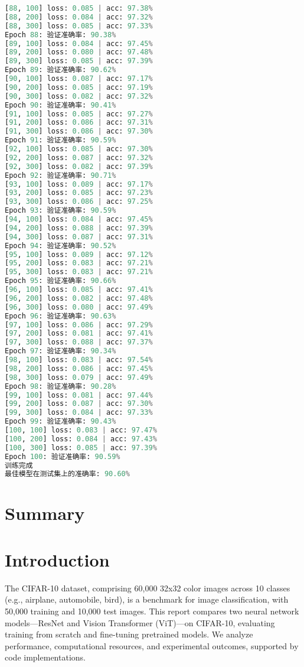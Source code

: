 \documentclass[UTF8]{report}
\theoremstyle{MyLineTheoremStyle} %
\theoremstyle{MyBlockTheoremStyle} %
\theoremstyle{MySubsubsectionStyle} %
\begin{document}
\begin{lstlisting}[language=python, caption={CNN训练结果一}, label={lst:cnn_train_result}]
[88, 100] loss: 0.085 | acc: 97.38%
[88, 200] loss: 0.084 | acc: 97.32%
[88, 300] loss: 0.085 | acc: 97.33%
Epoch 88: 验证准确率: 90.38%
[89, 100] loss: 0.084 | acc: 97.45%
[89, 200] loss: 0.080 | acc: 97.48%
[89, 300] loss: 0.085 | acc: 97.39%
Epoch 89: 验证准确率: 90.62%
[90, 100] loss: 0.087 | acc: 97.17%
[90, 200] loss: 0.085 | acc: 97.19%
[90, 300] loss: 0.082 | acc: 97.32%
Epoch 90: 验证准确率: 90.41%
[91, 100] loss: 0.085 | acc: 97.27%
[91, 200] loss: 0.086 | acc: 97.31%
[91, 300] loss: 0.086 | acc: 97.30%
Epoch 91: 验证准确率: 90.59%
[92, 100] loss: 0.085 | acc: 97.30%
[92, 200] loss: 0.087 | acc: 97.32%
[92, 300] loss: 0.082 | acc: 97.39%
Epoch 92: 验证准确率: 90.71%
[93, 100] loss: 0.089 | acc: 97.17%
[93, 200] loss: 0.085 | acc: 97.23%
[93, 300] loss: 0.086 | acc: 97.25%
Epoch 93: 验证准确率: 90.59%
[94, 100] loss: 0.084 | acc: 97.45%
[94, 200] loss: 0.088 | acc: 97.39%
[94, 300] loss: 0.087 | acc: 97.31%
Epoch 94: 验证准确率: 90.52%
[95, 100] loss: 0.089 | acc: 97.12%
[95, 200] loss: 0.083 | acc: 97.21%
[95, 300] loss: 0.083 | acc: 97.21%
Epoch 95: 验证准确率: 90.66%
[96, 100] loss: 0.085 | acc: 97.41%
[96, 200] loss: 0.082 | acc: 97.48%
[96, 300] loss: 0.080 | acc: 97.49%
Epoch 96: 验证准确率: 90.63%
[97, 100] loss: 0.086 | acc: 97.29%
[97, 200] loss: 0.081 | acc: 97.41%
[97, 300] loss: 0.088 | acc: 97.37%
Epoch 97: 验证准确率: 90.34%
[98, 100] loss: 0.083 | acc: 97.54%
[98, 200] loss: 0.086 | acc: 97.45%
[98, 300] loss: 0.079 | acc: 97.49%
Epoch 98: 验证准确率: 90.28%
[99, 100] loss: 0.081 | acc: 97.44%
[99, 200] loss: 0.087 | acc: 97.30%
[99, 300] loss: 0.084 | acc: 97.33%
Epoch 99: 验证准确率: 90.43%
[100, 100] loss: 0.083 | acc: 97.47%
[100, 200] loss: 0.084 | acc: 97.43%
[100, 300] loss: 0.085 | acc: 97.39%
Epoch 100: 验证准确率: 90.59%
训练完成
最佳模型在测试集上的准确率: 90.60%
\end{lstlisting}

\cleardoublepage


\section{Summary}

\section*{Introduction}
The CIFAR-10 dataset, comprising 60,000 32x32 color images across 10 classes (e.g., airplane, automobile, bird), is a benchmark for image classification, with 50,000 training and 10,000 test images. This report compares two neural network models—ResNet and Vision Transformer (ViT)—on CIFAR-10, evaluating training from scratch and fine-tuning pretrained models. We analyze performance, computational resources, and experimental outcomes, supported by code implementations.
\end{document}

